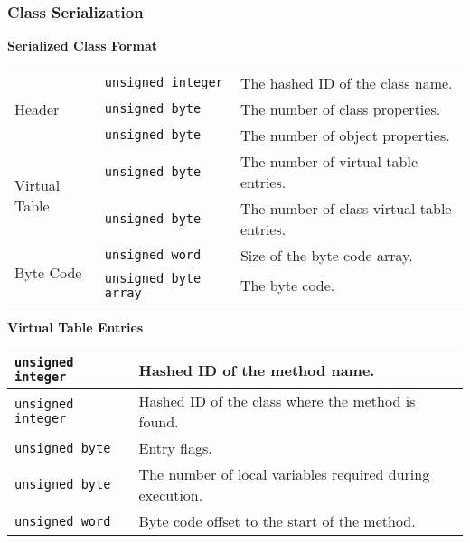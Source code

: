 \subsubsection{Class Serialization}
\label{sec:class_serial}

\textbf{Serialized Class Format}
\begin{center}
  \begin{tabular}{|l|l|p{8cm}|}
  	\hline
  	\multirow{3}{*}{Header}        & \texttt{unsigned integer}    & The hashed ID of the class name.           \\ \cline{2-3}
  	                               & \texttt{unsigned byte}       & The number of class properties.            \\ \cline{2-3}
  	                               & \texttt{unsigned byte}       & The number of object properties.           \\ \hline
  	\multirow{2}{*}{Virtual Table} & \texttt{unsigned byte}       & The number of virtual table entries.       \\ \cline{2-3}
  	                               & \texttt{unsigned byte}       & The number of class virtual table entries. \\ \hline
  	\multirow{2}{*}{Byte Code}     & \texttt{unsigned word}       & Size of the byte code array.               \\ \cline{2-3}
  	                               & \texttt{unsigned byte array} & The byte code.                             \\ \hline
  \end{tabular}
\end{center}

\textbf{Virtual Table Entries}
\begin{center}
  \begin{tabular}{|l|p{8cm}|}
  	\hline
  	\texttt{unsigned integer} & Hashed ID of the method name.                            \\ \hline
  	\texttt{unsigned integer} & Hashed ID of the class where the method is found.        \\ \hline
  	\texttt{unsigned byte}    & Entry flags.                                             \\ \hline
  	\texttt{unsigned byte}    & The number of local variables required during execution. \\ \hline
  	\texttt{unsigned word}    & Byte code offset to the start of the method.             \\ \hline
  \end{tabular}
\end{center}

